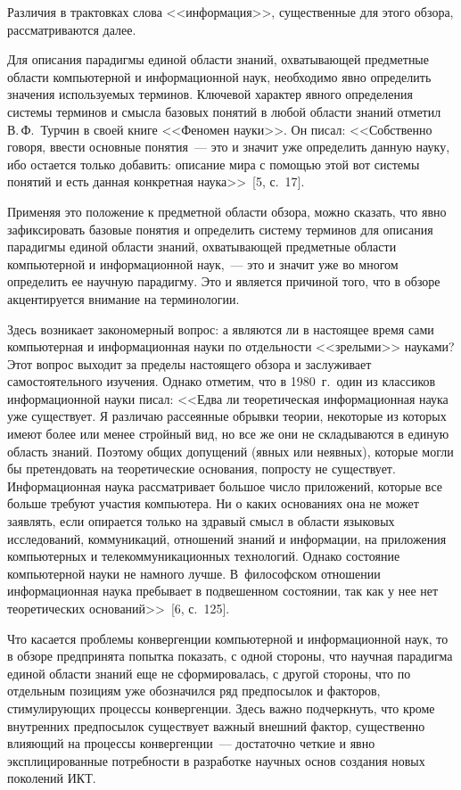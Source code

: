 \begin{multicols}{2}
Различия в трактовках слова <<информация>>, 
суще\-ст\-вен\-ные для этого обзора, 
рассматриваются \mbox{далее}.

      Для описания парадигмы единой области знаний, охватывающей предметные об\-ласти
компьютерной и информационной наук, необходимо явно определить значения используемых
терминов. Ключевой характер явного определения системы терминов и смысла базовых
понятий в любой об\-ласти знаний отметил В.\,Ф.~Турчин в своей книге <<Феномен науки>>. Он
писал: <<Собственно говоря, ввести основные понятия~--- это и значит уже определить данную
науку, ибо остается только добавить: описание мира с помощью этой вот системы понятий и
есть данная конкретная наука>>~[5, с.~17].

      Применяя это положение к предметной об\-ласти обзора, можно сказать, что явно
зафиксировать базовые понятия и определить систему терминов для описания парадигмы
единой области знаний, охватывающей предметные области компьютерной и информационной
наук,~--- это и значит уже во многом определить ее научную парадигму. Это и является причиной
того, что в обзоре акцентируется внимание на терминологии.

      Здесь возникает закономерный вопрос: а являются ли в настоящее время сами
компьютерная и информационная науки по отдельности <<зрелыми>> науками? Этот вопрос
выходит за пределы настоящего обзора и заслуживает самостоятельного изучения. Однако
отметим, что в 1980~г.\ один из классиков информационной науки писал: <<Едва ли
теоретическая информационная наука уже существует. Я различаю рассеянные обрывки
теории, некоторые из которых имеют более или менее стройный вид, но все же они не
складываются в единую область знаний. Поэтому общих допущений (явных или неявных),
которые могли бы претендовать на теоретические основания, попросту не существует.
Информационная наука рас\-смат\-ри\-ва\-ет большое число приложений, которые все больше
требуют участия компьютера. Ни о каких основаниях она не может заявлять, если опирается
только на здравый смысл в области языковых исследований, коммуникаций, отношений знаний
и информации, на приложения компьютерных и телекоммуникационных технологий. Однако
состояние компьютерной науки не намного лучше. В~философском отношении
информационная наука пребывает в подвешенном состоянии, так как у нее нет теоретических
оснований>>~[6, с.~125].

      Что касается проблемы конвергенции компьютерной и информационной наук, то в
обзоре предпринята попытка показать, с одной стороны, что научная парадигма единой области
знаний еще не сформировалась, с другой стороны, что по отдельным позициям уже обозначился
ряд предпосылок и факторов, стимулирующих процессы конвергенции. Здесь важно
подчеркнуть, что кроме внут\-рен\-них предпосылок существует важный внешний фактор,
существенно влияющий на процессы конвергенции~--- достаточно четкие и явно
эксплицированные потребности в разработке научных основ создания новых поколений
ИКТ.


\end{multicols}
